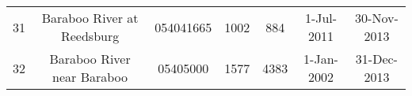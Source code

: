 \begin{table}[h]
\begin{tabular}{l c ccccc}
31	&	Baraboo  River at Reedsburg            & 054041665                   & 1002                                    & 884                               & 1-Jul-2011                     & 30-Nov-2013                  \\
32	&	Baraboo  River near Baraboo            & 05405000                    & 1577                                    & 4383                              & 1-Jan-2002                     & 31-Dec-2013                  \\
\hline                  
\end{tabular}
\label{tab:streamflow_calibration_sites}
\end{table}